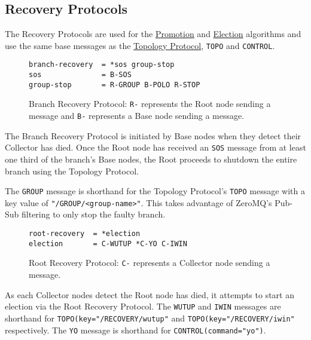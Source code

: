 \subsection{Recovery Protocols}
\label{proto_reco}

The \dcamp Recovery Protocols are used for the \hyperref[algor_promo]{Promotion} and \hyperref[algor_elect]{Election}
algorithms and use the same base messages as the \hyperref[proto_topo]{Topology Protocol}, \texttt{TOPO} and
\texttt{CONTROL}.

\begin{figure}[H]
\vspace{+10pt}
\begin{verbatim}
branch-recovery  = *sos group-stop
sos              = B-SOS
group-stop       = R-GROUP B-POLO R-STOP
\end{verbatim}
\vspace{-5pt}
\caption[Branch Recovery Protocol]
	{Branch Recovery Protocol: \texttt{R-} represents the Root node sending a message and \texttt{B-} represents a
	 Base node sending a message.}
\label{fig:proto_reco_branch_spec}
\end{figure}

The Branch Recovery Protocol is initiated by Base nodes when they detect their Collector has died. Once the Root node
has received an \texttt{SOS} message from at least one third of the branch's Base nodes, the Root proceeds to shutdown
the entire branch using the Topology Protocol.

The \texttt{GROUP} message is shorthand for the Topology Protocol's \texttt{TOPO} message with a key value of
\texttt{"/GROUP/<group-name>"}. This takes advantage of ZeroMQ's Pub-Sub filtering to only stop the faulty branch.

\begin{figure}[H]
\vspace{+10pt}
\begin{verbatim}
root-recovery  = *election
election       = C-WUTUP *C-YO C-IWIN
\end{verbatim}
\vspace{-5pt}
\caption[Root Recovery Protocol]
        {Root Recovery Protocol: \texttt{C-} represents a Collector node sending a message.}
\label{fig:proto_reco_root_spec}
\end{figure}

As each Collector nodes detect the Root node has died, it attempts to start an election via the Root Recovery Protocol.
The \texttt{WUTUP} and \texttt{IWIN} messages are shorthand for \texttt{TOPO(key="/RECOVERY/wutup"} and
\texttt{TOPO(key="/RECOVERY/iwin"} respectively. The \texttt{YO} message is shorthand for
\texttt{CONTROL(command="yo")}.
